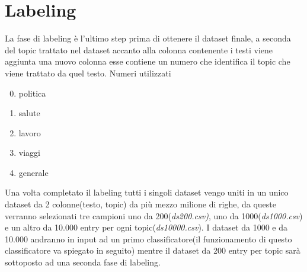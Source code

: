\section{Labeling}
La fase di labeling è l'ultimo step prima di ottenere il dataset finale, a seconda del topic trattato nel dataset  accanto alla colonna contenente i testi viene aggiunta una nuovo colonna esse contiene un numero che identifica il topic che viene trattato da quel testo. Numeri utilizzati
\begin{enumerate}
    \setcounter{enumi}{-1}
    \item politica
    \item salute
    \item lavoro
    \item viaggi
    \item generale
\end{enumerate}
Una volta completato il labeling tutti i singoli dataset vengo uniti in un unico dataset da 2 colonne(testo, topic) da più mezzo milione di righe, da queste verranno selezionati tre campioni uno da 200(\textit{ds200.csv)}, uno da 1000(\textit{ds1000.csv}) e un altro da 10.000 entry per ogni topic(\textit{ds10000.csv}).\newline
I dataset da 1000 e da 10.000 andranno in input ad un primo classificatore(il funzionamento di questo classificatore va spiegato in seguito) mentre il dataset da 200 entry per topic sarà sottoposto ad una seconda fase di labeling.


